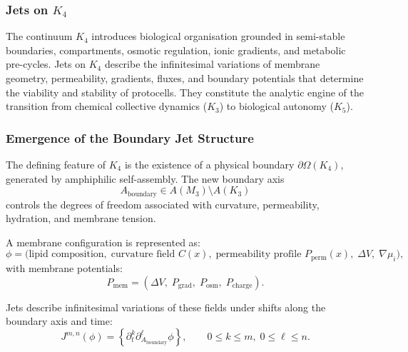 
\subsubsection{Jets on \texorpdfstring{$K_4$}{K_4}}
\label{sec:jets-k4}

The continuum $K_4$ introduces biological organisation grounded in
semi-stable boundaries, compartments, osmotic regulation, ionic
gradients, and metabolic pre-cycles. Jets on $K_4$ describe the
infinitesimal variations of membrane geometry, permeability, gradients,
fluxes, and boundary potentials that determine the viability and
stability of protocells. They constitute the analytic engine of the
transition from chemical collective dynamics ($K_3$) to biological
autonomy ($K_5$).


\subsubsection{Emergence of the Boundary Jet Structure}

The defining feature of $K_4$ is the existence of a physical boundary
$\partial\Omega(K_4)$, generated by amphiphilic self-assembly. The new
boundary axis
\[
A_{\mathrm{boundary}} \in A(M_3)\setminus A(K_3)
\]
controls the degrees of freedom associated with curvature, permeability,
hydration, and membrane tension.

A membrane configuration is represented as:
\[
\phi =
\bigl(
\text{lipid composition},\;
\text{curvature field } C(x),\;
\text{permeability profile } P_{\mathrm{perm}}(x),\;
\Delta V,\;
\nabla \mu_i
\bigr),
\]
with membrane potentials:
\[
P_{\mathrm{mem}} =
(\Delta V,\; P_{\mathrm{grad}},\; P_{\mathrm{osm}},\; P_{\mathrm{charge}}).
\]

Jets describe infinitesimal variations of these fields under shifts along
the boundary axis and time:
\[
J^{m,n}(\phi)=
\left\{
\partial_t^k\partial_{A_{\mathrm{boundary}}}^\ell \phi
\right\},
\qquad 0\le k\le m,\; 0\le \ell\le n.
\]


